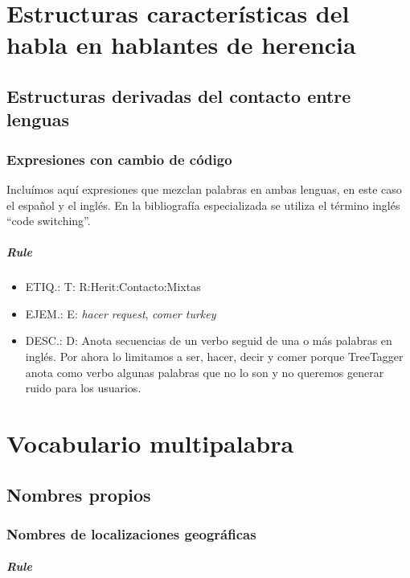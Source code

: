 \documentclass[11pt]{report}
\begin{document}
\chapter{Estructuras características del habla en hablantes de herencia}
\section{Estructuras derivadas del contacto entre lenguas}
\subsection{Expresiones con cambio de código}
Incluímos aquí expresiones que mezclan palabras en ambas lenguas, en este caso el español y el inglés. En la bibliografía especializada se utiliza el término inglés ``code switching''.

\paragraph*{Rule}
\begin{itemize}
\item ETIQ.:  T: R:Herit:Contacto:Mixtas
\item EJEM.:  E: \emph{hacer request}, \emph{comer turkey}
\item DESC.:  D: Anota secuencias de un verbo seguid de una o más palabras en inglés. Por ahora lo limitamos a ser, hacer, decir y comer porque TreeTagger anota como verbo algunas palabras que no lo son y no queremos generar ruido para los usuarios.
\end{itemize}

\chapter{Vocabulario multipalabra}
\section{Nombres propios}
\subsection{Nombres de localizaciones geográficas}
\paragraph*{Rule}
\end{document}
